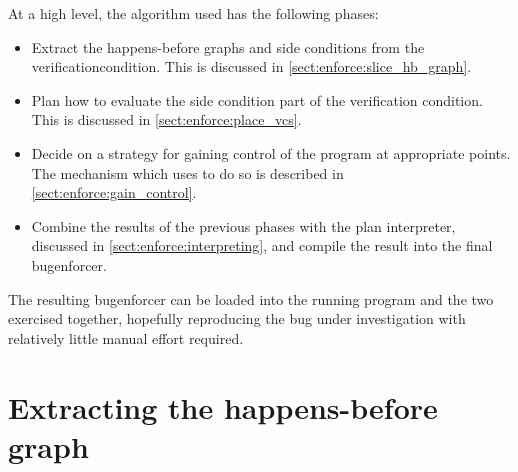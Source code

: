 At a high level, the algorithm used has the following phases:
\begin{itemize}
\item
  Extract the happens-before graphs and \glspl{side condition} from
  the \gls{verificationcondition}.  This is discussed in
  \autoref{sect:enforce:slice_hb_graph}.
\item
  Plan how to evaluate the \gls{side condition} part of the verification
  condition.  This is discussed in \autoref{sect:enforce:place_vcs}.
\item
  Decide on a strategy for gaining control of the program at
  appropriate points.  The mechanism which {\technique} uses to do so
  is described in \autoref{sect:enforce:gain_control}.
\item
  Combine the results of the previous phases with the \gls{plan
    interpreter}, discussed in \autoref{sect:enforce:interpreting},
  and compile the result into the final \gls{bugenforcer}.  
\end{itemize}
The resulting \gls{bugenforcer} can be loaded into the running program
and the two exercised together, hopefully reproducing the bug under
investigation with relatively little manual effort required.

\section{Extracting the happens-before graph}
\label{sect:enforce:slice_hb_graph}

